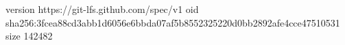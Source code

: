version https://git-lfs.github.com/spec/v1
oid sha256:3fcea88cd3abb1d6056e6bbda07af5b8552325220d0bb2892afe4cce47510531
size 142482
